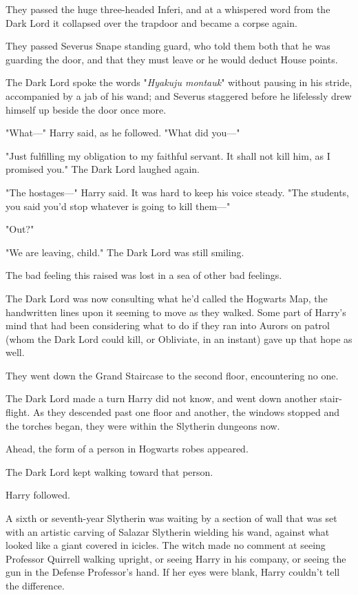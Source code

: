 They passed the huge three-headed Inferi, and at a whispered word from the Dark
Lord it collapsed over the trapdoor and became a corpse again.

They passed Severus Snape standing guard, who told them both that he was
guarding the door, and that they must leave or he would deduct House points.

The Dark Lord spoke the words "\emph{Hyakuju montauk}" without pausing in his
stride, accompanied by a jab of his wand; and Severus staggered before he
lifelessly drew himself up beside the door once more.

"What\mbox{---}" Harry said, as he followed. "What did you\mbox{---}"

"Just fulfilling my obligation to my faithful servant. It shall not kill him,
as I promised you." The Dark Lord laughed again.

"The hostages\mbox{---}" Harry said. It was hard to keep his voice steady. "The
students, you said you'd stop whatever is going to kill them\mbox{---}"


"Out?"

"We are leaving, child." The Dark Lord was still smiling.

The bad feeling this raised was lost in a sea of other bad feelings.

The Dark Lord was now consulting what he'd called the Hogwarts Map, the
handwritten lines upon it seeming to move as they walked. Some part of Harry's
mind that had been considering what to do if they ran into Aurors on patrol
(whom the Dark Lord could kill, or Obliviate, in an instant) gave up that hope
as well.

They went down the Grand Staircase to the second floor, encountering no one.

The Dark Lord made a turn Harry did not know, and went down another
stair-flight. As they descended past one floor and another, the windows stopped
and the torches began, they were within the Slytherin dungeons now.

Ahead, the form of a person in Hogwarts robes appeared.

The Dark Lord kept walking toward that person.

Harry followed.

A sixth or seventh-year Slytherin was waiting by a section of wall that was set
with an artistic carving of Salazar Slytherin wielding his wand, against what
looked like a giant covered in icicles. The witch made no comment at seeing
Professor Quirrell walking upright, or seeing Harry in his company, or seeing
the gun in the Defense Professor's hand. If her eyes were blank, Harry couldn't
tell the difference.

